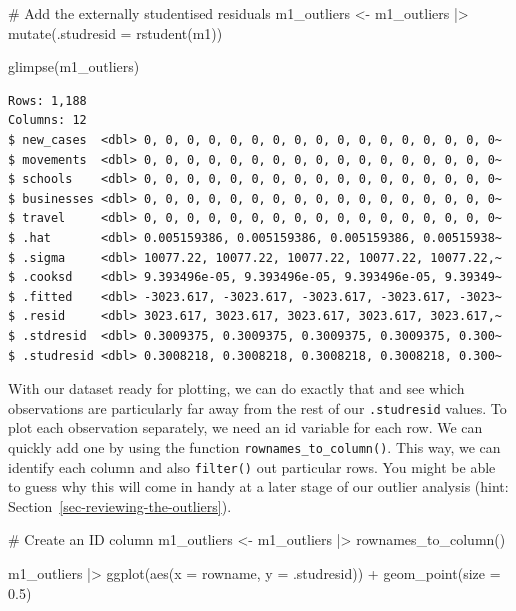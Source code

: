 \documentclass[
  letterpaper,
]{krantz}
\makeatletter
\newenvironment{Shaded}{\begin{snugshade}}{\end{snugshade}}
\newcommand{\AttributeTok}[1]{\textcolor[rgb]{0.40,0.45,0.13}{#1}}
\newcommand{\CommentTok}[1]{\textcolor[rgb]{0.37,0.37,0.37}{#1}}
\newcommand{\FloatTok}[1]{\textcolor[rgb]{0.68,0.00,0.00}{#1}}
\newcommand{\FunctionTok}[1]{\textcolor[rgb]{0.28,0.35,0.67}{#1}}
\newcommand{\NormalTok}[1]{\textcolor[rgb]{0.00,0.23,0.31}{#1}}
\newcommand{\OtherTok}[1]{\textcolor[rgb]{0.00,0.23,0.31}{#1}}
\newcommand{\SpecialCharTok}[1]{\textcolor[rgb]{0.37,0.37,0.37}{#1}}
\newenvironment{kframe}{%
\medskip{}
\setlength{\fboxsep}{.8em}
 \def\at@end@of@kframe{}%
 \ifinner\ifhmode%
  \def\at@end@of@kframe{\end{minipage}}%
  \begin{minipage}{\columnwidth}%
 \fi\fi%
 \def\FrameCommand##1{\hskip\@totalleftmargin \hskip-\fboxsep
 \colorbox{shadecolor}{##1}\hskip-\fboxsep
     \hskip-\linewidth \hskip-\@totalleftmargin \hskip\columnwidth}%
 \MakeFramed {\advance\hsize-\width
   \@totalleftmargin\z@ \linewidth\hsize
   \@setminipage}}%
 {\par\unskip\endMakeFramed%
 \at@end@of@kframe}
\renewenvironment{Shaded}{\begin{kframe}}{\end{kframe}}
\makeatother
\begin{document}
\begin{Shaded}
\begin{Highlighting}[]
\CommentTok{\# Add the externally studentised residuals}
\NormalTok{m1\_outliers }\OtherTok{\textless{}{-}}
\NormalTok{  m1\_outliers }\SpecialCharTok{|\textgreater{}}
  \FunctionTok{mutate}\NormalTok{(}\AttributeTok{.studresid =} \FunctionTok{rstudent}\NormalTok{(m1))}

\FunctionTok{glimpse}\NormalTok{(m1\_outliers)}
\end{Highlighting}
\end{Shaded}

\begin{verbatim}
Rows: 1,188
Columns: 12
$ new_cases  <dbl> 0, 0, 0, 0, 0, 0, 0, 0, 0, 0, 0, 0, 0, 0, 0, 0, 0~
$ movements  <dbl> 0, 0, 0, 0, 0, 0, 0, 0, 0, 0, 0, 0, 0, 0, 0, 0, 0~
$ schools    <dbl> 0, 0, 0, 0, 0, 0, 0, 0, 0, 0, 0, 0, 0, 0, 0, 0, 0~
$ businesses <dbl> 0, 0, 0, 0, 0, 0, 0, 0, 0, 0, 0, 0, 0, 0, 0, 0, 0~
$ travel     <dbl> 0, 0, 0, 0, 0, 0, 0, 0, 0, 0, 0, 0, 0, 0, 0, 0, 0~
$ .hat       <dbl> 0.005159386, 0.005159386, 0.005159386, 0.00515938~
$ .sigma     <dbl> 10077.22, 10077.22, 10077.22, 10077.22, 10077.22,~
$ .cooksd    <dbl> 9.393496e-05, 9.393496e-05, 9.393496e-05, 9.39349~
$ .fitted    <dbl> -3023.617, -3023.617, -3023.617, -3023.617, -3023~
$ .resid     <dbl> 3023.617, 3023.617, 3023.617, 3023.617, 3023.617,~
$ .stdresid  <dbl> 0.3009375, 0.3009375, 0.3009375, 0.3009375, 0.300~
$ .studresid <dbl> 0.3008218, 0.3008218, 0.3008218, 0.3008218, 0.300~
\end{verbatim}

With our dataset ready for plotting, we can do exactly that and see
which observations are particularly far away from the rest of our
\texttt{.studresid} values. To plot each observation separately, we need
an id variable for each row. We can quickly add one by using the
function \texttt{rownames\_to\_column()}. This way, we can identify each
column and also \texttt{filter()} out particular rows. You might be able
to guess why this will come in handy at a later stage of our outlier
analysis (hint: Section~\ref{sec-reviewing-the-outliers}).

\begin{Shaded}
\begin{Highlighting}[]
\CommentTok{\# Create an ID column}
\NormalTok{m1\_outliers }\OtherTok{\textless{}{-}}\NormalTok{ m1\_outliers }\SpecialCharTok{|\textgreater{}} \FunctionTok{rownames\_to\_column}\NormalTok{()}

\NormalTok{m1\_outliers }\SpecialCharTok{|\textgreater{}}
  \FunctionTok{ggplot}\NormalTok{(}\FunctionTok{aes}\NormalTok{(}\AttributeTok{x =}\NormalTok{ rowname,}
             \AttributeTok{y =}\NormalTok{ .studresid)) }\SpecialCharTok{+}
  \FunctionTok{geom\_point}\NormalTok{(}\AttributeTok{size =} \FloatTok{0.5}\NormalTok{)}
\end{Highlighting}
\end{Shaded}
\end{document}
